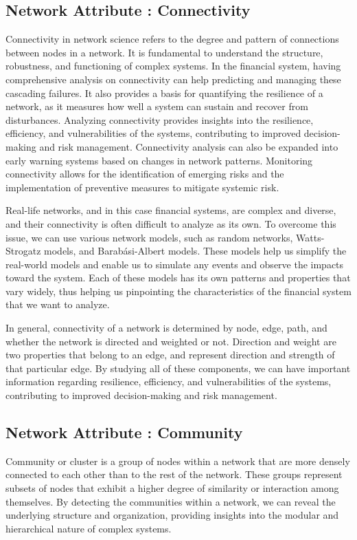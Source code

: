 \documentclass[a4paper,11pt]{article}
\begin{document}
\subsection{Network Attribute : Connectivity}
Connectivity in network science refers to the degree and pattern of connections between nodes in a network. It is fundamental to understand the structure, robustness, and functioning of complex systems. In the financial system, having comprehensive analysis on connectivity can help predicting and managing these cascading failures. It also provides a basis for quantifying the resilience of a network, as it measures how well a system can sustain and recover from disturbances. Analyzing connectivity provides insights into the resilience, efficiency, and vulnerabilities of the systems, contributing to improved decision-making and risk management. Connectivity analysis can also be expanded into early warning systems based on changes in network patterns. Monitoring connectivity allows for the identification of emerging risks and the implementation of preventive measures to mitigate systemic risk.

Real-life networks, and in this case financial systems, are complex and diverse, and their connectivity is often difficult to analyze as its own. To overcome this issue, we can use various network models, such as random networks, Watts-Strogatz models, and Barabási-Albert models. These models help us simplify the real-world models and enable us to simulate any events and observe the impacts toward the system. 
Each of these models has its own patterns and properties that vary widely, thus helping us pinpointing the characteristics of the financial system that we want to analyze.

In general, connectivity of a network is determined by node, edge, path, and whether the network is directed and weighted or not. Direction and weight are two properties that belong to an edge, and represent direction and strength of that particular edge. By studying all of these components, we can have important information regarding resilience, efficiency, and vulnerabilities of the systems, contributing to improved decision-making and risk management.

\subsection{Network Attribute : Community}
Community or cluster is a group of nodes within a network that are more densely connected to each other than to the rest of the network. These groups represent subsets of nodes that exhibit a higher degree of similarity or interaction among themselves. By detecting the communities within a network, we can reveal the underlying structure and organization, providing insights into the modular and hierarchical nature of complex systems.
\end{document}
